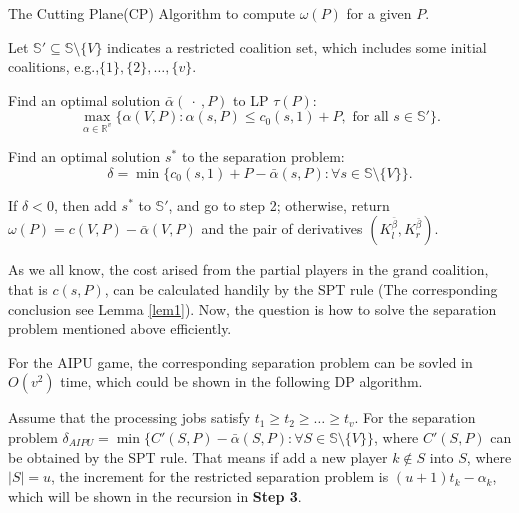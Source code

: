 \begin{algorithm}[h]\label{algoCP}
\caption{The Cutting Plane(CP) Algorithm to compute $\omega(P)$ for a given $P$.}
\begin{algorithmic}[1]

\begin{description}
  \justifying
  \item[Step 1.] Let $\mathbb{S}'\subseteq \mathbb{S}\setminus \{V\}$ indicates a restricted coalition set, which includes some initial coalitions,
  \vspace{10pt}
  e.g.,$ \{1\},\{2\},\ldots,\{v\}$.
  \item[Step 2.] Find an optimal solution $\bar{\alpha}(\ \cdot \ ,P)$ to LP $\tau(P)$:
  \begin{equation*}
  \max_{\alpha\in \mathbb{R}^v} \big\{ \alpha(V,P): \alpha(s,P) \leq c_0(s,1)+P, \mbox{ for all } s \in \mathbb{S}'\big\}.
  \end{equation*}
  \vspace{-11pt}
  \item[Step 3.]
  Find an optimal solution $s^*$ to the separation problem:
  \begin{equation*}
  \delta = \min \big\{ c_0(s,1)+ P -\bar{\alpha}(s,P): \forall s \in \mathbb{S} \setminus \{V\}\big\}.
  \end{equation*}
  \item[Step 4.]
  If $\delta<0$, then add $s^*$ to $\mathbb{S}'$, and go to step 2; otherwise, return $\omega(P)=c(V,P)-\bar{\alpha}(V,P)$ and the pair of derivatives $(K_{l}^{\bar{\beta}},K_{r}^{\bar{\beta}})$.
\end{description}

\end{algorithmic}
\end{algorithm}

As we all know, the cost arised from the partial players in the grand coalition, that is $c(s,P)$, can be calculated handily by the SPT rule (The corresponding conclusion see Lemma \ref{lem1}).
Now, the question is how to solve the separation problem mentioned above efficiently.

\begin{lem}\label{lem3}
  For the AIPU game, the corresponding separation problem can be sovled in $O(v^2)$ time, which could be shown in the following DP algorithm.
\end{lem}

Assume that the processing jobs satisfy $t_1 \geq t_2 \geq \ldots \geq t_v$. For the separation problem $\delta_{AIPU} = \min \big\{ C'(S,P) -\bar{\alpha}(S,P): \forall S \in \mathbb{S} \setminus \{V\}\big\}$, where $C'(S,P)$ can be obtained by the SPT rule. That means if add a new player $k\notin S$ into $S$, where $|S| =u$, the increment for the restricted separation problem is $(u+1)t_k-\alpha_k$, which will be shown in the recursion in \textbf{Step 3}.

